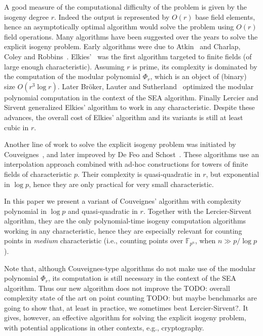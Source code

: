 \documentclass{lms}
\newcommand{\todo}[1]{{\color{red}TODO: #1}}
\newcommand{\F}{\mathbb{F}}
\begin{document}
A good measure of the computational difficulty of the problem is given
by the isogeny degree $r$. Indeed the output is represented by
$O(r)$ base field elements, hence an asymptotically optimal algorithm
would solve the problem using $O(r)$ field operations. Many algorithms
have been suggested over the years to solve the explicit isogeny
problem. Early algorithms were due to Atkin~\cite{atkin91} and
Charlap, Coley and
Robbins~\cite{charlap1991enumeration}. Elkies'~\cite{elkies92,elkies98,Bostan}
was the first algorithm targeted to finite fields (of large enough
characteristic). Assuming $r$ is prime, its complexity is dominated by
the computation of the modular polynomial $\Phi_r$, which is an object
of (binary) size $O(r^3\log r)$. Later Bröker, Lauter and
Sutherland~\cite{sutherland10:modpol} optimized the modular polynomial
computation in the context of the SEA
algorithm. Finally Lercier and Sirvent\cite{lercier+sirvent08,1602.00244}
generalized Elkies' algorithm to work in any characteristic. Despite
these advances, the overall cost of Elkies' algorithm and its
variants is still at least cubic in $r$.

Another line of work to solve the explicit isogeny problem was
initiated by Couveignes~\cite{couveignes94,couveignes96,couveignes00},
and later improved by De Feo and Schost~\cite{df10,df+schost12}. These
algorithms use an interpolation approach combined with ad-hoc
constructions for towers of finite fields of characteristic $p$. Their
complexity is quasi-quadratic in $r$, but exponential in $\log p$,
hence they are only practical for very small characteristic.

In this paper we present a variant of Couveignes' algorithm with
complexity polynomial in $\log p$ and quasi-quadratic in $r$. Together
with the Lercier-Sirvent algorithm, they are the only polynomial-time
isogeny computation algorithms working in any characteristic, hence
they are especially relevant for counting points in \emph{medium}
characteristic (i.e., counting points over $\F_{p^n}$, when
$n\gg p/\log p$).

Note that, although Couveignes-type algorithms do not make use of the
modular polynomial $\Phi_r$, its computation is still necessary in the
context of the SEA algorithm. Thus our new algorithm does not improve
the \todo{overall complexity} state of the art on point counting \todo{but maybe benchmarks are
  going to show that, at least in practice, we sometimes beat
  Lercier-Sirvent?}. It gives, however, an effective algorithm for
solving the explicit isogeny problem, with potential applications in
other contexts, e.g., cryptography.
\end{document}
